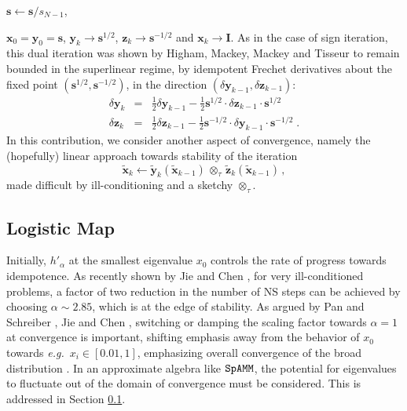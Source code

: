 \documentclass[letterpaper,twocolumn,amsmath,amsfont,amssymb,english,aps,jcp,preprintnumbers,groupaddress,nofootinbib,tightenlines,floatfix]{revtex4}
\newcommand{\mat}[1]{\boldsymbol{#1}}
\newcommand{\ot}{  {\scriptstyle \otimes}_{ \tau } }
\theoremstyle{plain}
\theoremstyle{remark}
\theoremstyle{plain}
\begin{document}
 $\mat{s} \leftarrow \mat{s}/s_{N-1}$, 

$\mat{x}_0=\mat{y}_0=\mat{s}$, ${\mat{y}}_k \rightarrow
\mat{s}^{1/2}$, ${\mat{z}}_k \rightarrow \mat{s}^{-1/2}$ and
${\mat{x}}_k \rightarrow {\mat{I}}$.  As in the case of sign
iteration, this dual iteration was shown by Higham, Mackey, Mackey and
Tisseur \cite{Higham2005} to remain bounded in the superlinear regime,
by idempotent Frechet derivatives about the fixed point
$\left(\mat{s}^{1/2},\mat{s}^{-1/2}\right)$, in the direction $\left(
\delta \mat{y}_{k-1} , \delta \mat{z}_{k-1} \right)$:
\begin{eqnarray}
\delta \mat{y}_k &=& \frac{1}{2} \delta \mat{y}_{k-1} - \frac{1}{2} \mat{s}^{1/2} \cdot \delta \mat{z}_{k-1} \cdot \mat{s}^{1/2} \\
\delta \mat{z}_k &=& \frac{1}{2} \delta \mat{z}_{k-1} - \frac{1}{2} \mat{s}^{-1/2} \cdot \delta \mat{y}_{k-1} \cdot \mat{s}^{-1/2} \;.
\end{eqnarray}
In this contribution, we consider another aspect of convergence,
namely the (hopefully) linear approach towards stability of the
iteration
\begin{equation}
\widetilde{\mat{x}}_k \leftarrow
 \widetilde{\mat{y}}_k \left( \widetilde{\mat{x}}_{k-1} \right)
\, \ot \, \widetilde{\mat{z}}_k \left( \widetilde{\mat{x}}_{k-1} \right) \, ,
\end{equation}
made difficult by ill-conditioning and a sketchy $\ot$.

\subsection{Logistic Map}

Initially, $h'_\alpha$ at the smallest eigenvalue $x_0$ controls the
rate of progress towards idempotence.  As recently shown by Jie and
Chen \cite{Chen2014}, for very ill-conditioned problems, a factor of
two reduction in the number of NS steps can be achieved by choosing
$\alpha \sim 2.85$, which is at the edge of stability.  As argued by
Pan and Schreiber \cite{Pan1991}, Jie and Chen \cite{Chen2014},
switching or damping the scaling factor towards $\alpha=1$ at
convergence is important, shifting emphasis away from the behavior of
$x_0$ towards {\em e.g.}~$x_i \in [0.01,1]$, emphasizing overall
convergence of the broad distribution \cite{Pan and Scriber}.  In an
approximate algebra like $\tt SpAMM$, the potential for eigenvalues to
fluctuate out of the domain of convergence must be considered.  This
is addressed in Section \ref{}.
\end{document}
